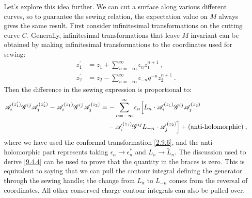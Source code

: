 Let's explore this idea further. We can cut a surface along various different curves, so to guarantee the sewing relation, the expectation value on $M$ always gives the same result. 
First consider infinitesimal transformations on the cutting curve $C$.
Generally, infinitesimal transformations that leave $M$ invariant can be obtained by making infinitesimal transformations to the coordinates used for sewing:
\begin{subequations} \label{9.4.8}
	\begin{align}
		z_{1}^{\prime} &= z_{1} + \sum_{n=-\infty}^{\infty} \epsilon_{n} z_{1}^{n+1}  \:, \label{9.4.8a} \\
		z_{2}^{\prime} &= z_{2} - \sum_{n=-\infty}^{\infty} \epsilon_{-n} q^{-n} z_{2}^{n+1} \:.
		\label{9.4.8b}
	\end{align}
\end{subequations}
Then the difference in the sewing expression is proportional to:
\begin{align}
	\mathscr{A}_{i}^{(z_{1}^{\prime})} \mathscr{G}^{ij} \mathscr{A}_{j}^{(z_{2}^{\prime})} - 
	\mathscr{A}_{i}^{(z_{1})} \mathscr{G}^{ij} \mathscr{A}_{j}^{(z_{2})} 
	&= -\sum_{n=-\infty}^{\infty} \epsilon_{n} \Bigl[L_{n} \cdot \mathscr{A}_{i}^{(z_{1})} \mathscr{G}^{ij} \mathscr{A}_{j}^{(z_{2})} \nonumber \\
	&\quad -\mathscr{A}_{i}^{(z_{1})} \mathscr{G}^{ij} L_{-n} \cdot \mathscr{A}_{j}^{(z_{2})}\Bigr]+\text{(anti-holomorphic)} \:, \label{9.4.9}
\end{align}
where we have used the conformal transformation \eqref{2.9.6}, and the anti-holomorphic part represents taking $\epsilon_{n} \rightarrow \epsilon_{n}^{*}$ and $L_{n} \rightarrow \tilde{L}_{n}$.
The discussion used to derive \eqref{9.4.4} can be used to prove that the quantity in the braces is zero. This is equivalent to saying that we can pull the contour integral defining the generator through the sewing handle; 
the change from $L_{n}$ to $L_{-n}$ comes from the reversal of coordinates. All other conserved charge contour integrals can also be pulled over.
